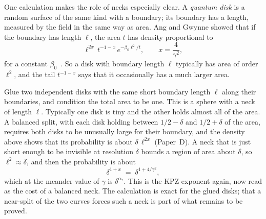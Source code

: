 One calculation makes the role of necks especially clear. A \emph{quantum disk} is a random
surface of the same kind with a boundary; its boundary has a length, measured by the field in the
same way as area. Ang and Gwynne showed that if the boundary has length $\ell$, the area $t$ has
density proportional to
\[ \ell^{2x}\, t^{-1-x}\, e^{-\beta_0\ell^2/t}, \qquad x=\frac4{\gamma^2},\]
for a constant $\beta_0$~\cite{AG}. So a disk with boundary length $\ell$ typically has area of
order $\ell^2$, and the tail $t^{-1-x}$ says that it occasionally has a much larger area.

Glue two independent disks with the same short boundary length $\ell$ along their boundaries,
and condition the total area to be one. This is a sphere with a neck of length $\ell$. Typically
one disk is tiny and the other holds almost all of the area. A balanced split, with each disk
holding between $1/2-\delta$ and $1/2+\delta$ of the area, requires both disks to be unusually
large for their boundary, and the density above shows that its probability is about
$\delta\,\ell^{2x}$ (Paper~D). A neck that is just short enough to be invisible at resolution $\delta$
bounds a region of area about $\delta$, so $\ell^2\approx\delta$, and then the probability is
about
\[ \delta^{1+x} \;=\; \delta^{1+4/\gamma^2} ,\]
which at the meander value of $\gamma$ is $\delta^{\alpha_*}$. This is the KPZ exponent again,
now read as the cost of a balanced neck. The calculation is exact for the glued disks; that a
near-split of the two curves forces such a neck is part of what remains to be proved.
